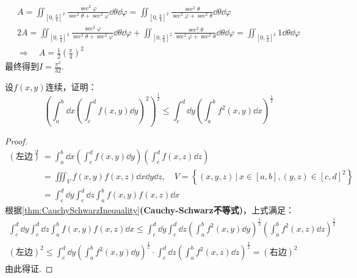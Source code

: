 \begin{solution}
    \begin{gather*}
        A = \iint_{[0,\frac{\pi}{4}]^2}\frac{\sec^2\varphi}{\sec^2\theta+\sec^2\varphi}\dd{\theta}\dd{\varphi} = \iint_{[0,\frac{\pi}{4}]^2}\frac{\sec^2\theta}{\sec^2\varphi+\sec^2\theta}\dd{\theta}\dd{\varphi} \\
        2A = \iint_{[0,\frac{\pi}{4}]^2}\frac{\sec^2\varphi}{\sec^2\theta+\sec^2\varphi}\dd{\theta}\dd{\varphi} + \iint_{[0,\frac{\pi}{4}]^2}\frac{\sec^2\theta}{\sec^2\varphi+\sec^2\theta}\dd{\theta}\dd{\varphi} = \iint_{[0,\frac{\pi}{4}]^2}1\dd{\theta}\dd{\varphi} \\
        \Rightarrow\quad A = \frac{1}{2}\left(\frac{\pi}{4}\right)^2
    \end{gather*}
    最终得到$\displaystyle I = \frac{\pi^2}{32}$.
\end{solution}

\begin{question}
    设$f(x,y)$连续，证明：
    \[\left(\int_{a}^{b}\dd{x}\left(\int_{c}^{d}f(x,y)\dd{y}\right)^2\right)^{\frac{1}{2}} \leqslant \int_{c}^{d}\dd{y}\left(\int_{a}^{b}f^2(x,y)\dd{x}\right)^{\frac{1}{2}}\]
\end{question}

\begin{proof}
    \begin{align*}
        (\text{左边})^2 &= \int_{a}^{b}\dd{x}\left(\int_{c}^{d}f(x,y)\dd{y}\right)\left(\int_{c}^{d}f(x,z)\dd{z}\right) \\
        &= \iiint_V f(x,y) f(x,z) \dd{x}\dd{y}\dd{z},\quad V = \left\{(x,y,z)\,|\, x \in [a,b],(y,z)\in[c,d]^2\right\} \\
        &= \int_{c}^{d}\dd{y}\int_{c}^{d}\dd{z}\int_{a}^{b}f(x,y)f(x,z)\dd{x}
    \end{align*}
    根据\cref{thm:CauchySchwarzInequality}\textbf{(Cauchy-Schwarz不等式)}，上式满足：
    \begin{gather*}
        \int_{c}^{d}\!\!\!\dd{y}\int_{c}^{d}\!\!\!\dd{z}\int_{a}^{b}\!\!\!f(x,y)f(x,z)\dd{x} \leqslant \int_{c}^{d}\!\!\!\dd{y}\int_{c}^{d}\!\!\!\dd{z}\left(\int_{a}^{b}\!\!\!f^2(x,y)\dd{y}\right)^{\frac{1}{2}}\left(\int_{a}^{b}\!\!\!f^2(x,z)\dd{z}\right)^{\frac{1}{2}} \\
        (\text{左边})^2 \leqslant \int_{c}^{d}\!\!\!\dd{y}\left(\int_{a}^{b}\!\!\!f^2(x,y)\dd{y}\right)^{\frac{1}{2}} \cdot \int_{c}^{d}\!\!\!\dd{z}\left(\int_{a}^{b}\!\!\!f^2(x,z)\dd{z}\right)^{\frac{1}{2}} = (\text{右边})^2
    \end{gather*}
    由此得证.
\end{proof}


